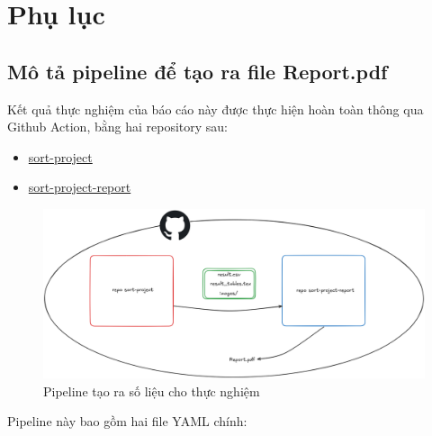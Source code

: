 \section{Phụ lục}

\subsection{Mô tả pipeline để tạo ra file Report.pdf}
Kết quả thực nghiệm của báo cáo này được thực hiện hoàn toàn thông qua Github Action, bằng hai repository sau:
\begin{itemize}
    \item \href{https://github.com/magnusdtd/sort-project/}{sort-project}
    \item \href{https://github.com/magnusdtd/sort-project-report/}{sort-project-report}
\end{itemize}

\begin{figure}[H]
    \centering
    \includegraphics[width=\textwidth]{img/pipeline.png}
    \caption{Pipeline tạo ra số liệu cho thực nghiệm}
    \label{fig:pipeline}
\end{figure}

Pipeline này bao gồm hai file YAML chính:

